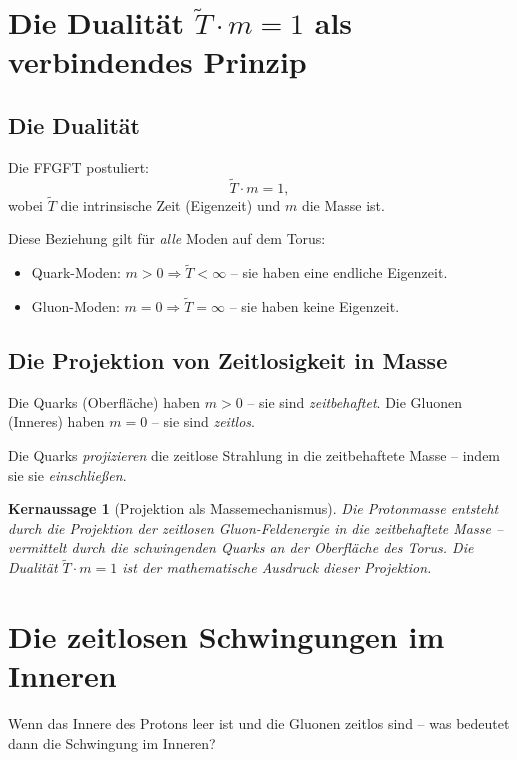 \documentclass[11pt,a4paper]{article}
\newtheorem{keyresult}{Kernaussage}
\begin{document}
	\section{Die Dualität \(\tilde{T}\cdot m = 1\) als verbindendes Prinzip}
	
	\subsection{Die Dualität}
	
	Die FFGFT postuliert:
	\[
	\tilde{T} \cdot m = 1,
	\]
	wobei \(\tilde{T}\) die intrinsische Zeit (Eigenzeit) und \(m\) die Masse ist.
	
	Diese Beziehung gilt für \emph{alle} Moden auf dem Torus:
	\begin{itemize}
		\item Quark-Moden: \(m > 0 \Rightarrow \tilde{T} < \infty\) -- sie haben eine endliche Eigenzeit.
		\item Gluon-Moden: \(m = 0 \Rightarrow \tilde{T} = \infty\) -- sie haben keine Eigenzeit.
	\end{itemize}
	
	\subsection{Die Projektion von Zeitlosigkeit in Masse}
	
	Die Quarks (Oberfläche) haben \(m > 0\) -- sie sind \emph{zeitbehaftet}. 
	Die Gluonen (Inneres) haben \(m = 0\) -- sie sind \emph{zeitlos}.
	
	Die Quarks \emph{projizieren} die zeitlose Strahlung in die zeitbehaftete Masse -- indem sie sie \emph{einschließen}.
	
	\begin{keyresult}[Projektion als Massemechanismus]
		Die Protonmasse entsteht durch die \emph{Projektion} der zeitlosen Gluon-Feldenergie in die zeitbehaftete Masse -- vermittelt durch die schwingenden Quarks an der Oberfläche des Torus. 
		Die Dualität \(\tilde{T}\cdot m = 1\) ist der mathematische Ausdruck dieser Projektion.
	\end{keyresult}
	
	\section{Die zeitlosen Schwingungen im Inneren}
	
	Wenn das Innere des Protons leer ist und die Gluonen zeitlos sind -- was bedeutet dann die Schwingung im Inneren?
	
\end{document}
